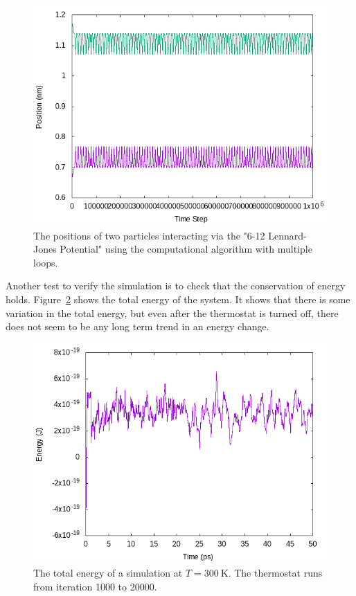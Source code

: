 \documentclass[]{article}
\newcommand{\unit}[2]{#1~\mathrm{#2}}
\begin{document}
\begin{figure}[htb]
	\centering
	\includegraphics[width=\textwidth]{figures/no_growth.png}
	\caption{The positions of two particles interacting via the "6-12 Lennard-Jones Potential" using the computational algorithm with multiple loops.}
	\label{fig:no_growth}
\end{figure}

Another test to verify the simulation is to check that the conservation of energy holds.
Figure~\ref{fig:energy_cons} shows the total energy of the system.
It shows that there is some variation in the total energy, but even after the thermostat is turned off, there does not seem to be any long term trend in an energy change.

\begin{figure}[htb]
	\centering
	\includegraphics[width=\textwidth]{figures/energy_cons.png}
	\caption{The total energy of a simulation at $T = \unit{300}{K}$. The thermostat runs from iteration 1000 to 20000.}
	\label{fig:energy_cons}
\end{figure}
\end{document}
